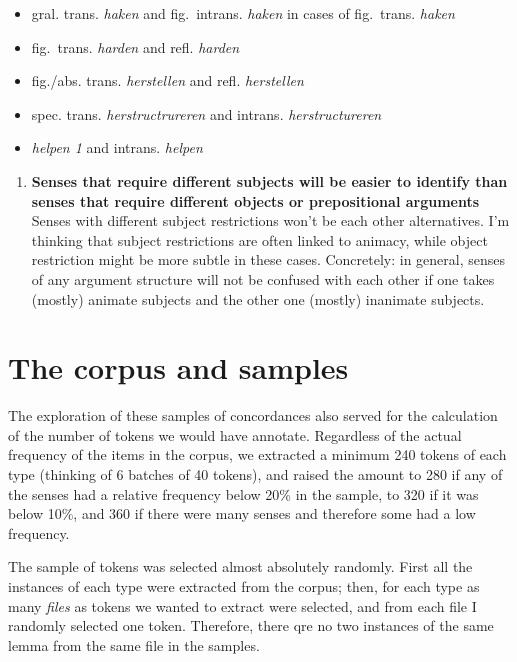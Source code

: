 \documentclass[
]{book}
\providecommand{\tightlist}{%
  \setlength{\itemsep}{0pt}\setlength{\parskip}{0pt}}
\begin{document}
\begin{itemize}
\tightlist
\item
  gral. trans. \emph{haken} and fig.~intrans. \emph{haken} in cases of fig.~trans. \emph{haken}
\item
  fig.~trans. \emph{harden} and refl. \emph{harden}
\item
  fig./abs. trans. \emph{herstellen} and refl. \emph{herstellen}
\item
  spec. trans. \emph{herstructrureren} and intrans. \emph{herstructureren}
\item
  \emph{helpen 1} and intrans. \emph{helpen}
\end{itemize}

\begin{enumerate}
\def\labelenumi{\arabic{enumi}.}
\setcounter{enumi}{5}
\tightlist
\item
  \textbf{Senses that require different subjects will be easier to identify than senses that require different objects or prepositional arguments}
  Senses with different subject restrictions won't be each other alternatives. I'm thinking that subject restrictions are often linked to animacy, while object restriction might be more subtle in these cases.
  Concretely: in general, senses of any argument structure will not be confused with each other if one takes (mostly) animate subjects and the other one (mostly) inanimate subjects.
\end{enumerate}

\hypertarget{corpus}{%
\section{The corpus and samples}\label{corpus}}

The exploration of these samples of concordances also served for the calculation of the number of tokens we would have annotate. Regardless of the actual frequency of the items in the corpus, we extracted a minimum 240 tokens of each type (thinking of 6 batches of 40 tokens), and raised the amount to 280 if any of the senses had a relative frequency below 20\% in the sample, to 320 if it was below 10\%, and 360 if there were many senses and therefore some had a low frequency.

The sample of tokens was selected almost absolutely randomly. First all the instances of each type were extracted from the corpus; then, for each type as many \emph{files} as tokens we wanted to extract were selected, and from each file I randomly selected one token. Therefore, there qre no two instances of the same lemma from the same file in the samples.
\end{document}

